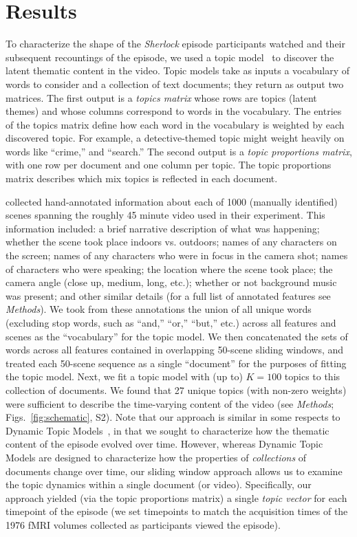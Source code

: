 \documentclass{article}
\newcommand{\topics}{S2}
\begin{document}
\section*{Results}
To characterize the shape of the \textit{Sherlock} episode participants watched and their subsequent recountings of the episode, we used a topic model~\citep{BleiEtal03} to discover the latent thematic content in the video.  Topic models take as inputs a vocabulary of words to consider and a collection of text documents; they return as output two matrices.  The first output is a \textit{topics matrix} whose rows are topics (latent themes) and whose columns correspond to words in the vocabulary. The entries of the topics matrix define how each word in the vocabulary is weighted by each discovered topic.  For example, a detective-themed topic might weight heavily on words like ``crime,'' and ``search.''  The second output is a \textit{topic proportions matrix}, with one row per document and one column per topic.  The topic proportions matrix describes which mix topics is reflected in each document.

\cite{ChenEtal17} collected hand-annotated information about each of 1000 (manually identified) scenes spanning the roughly 45 minute video used in their experiment.  This information included: a brief narrative description of what was happening; whether the scene took place indoors vs. outdoors; names of any characters on the screen; names of any characters who were in focus in the camera shot; names of characters who were speaking; the location where the scene took place; the camera angle (close up, medium, long, etc.); whether or not background music was present; and other similar details (for a full list of annotated features see \textit{Methods}).  We took from these annotations the union of all unique words (excluding stop words, such as ``and,'' ``or,'' ``but,'' etc.) across all features and scenes as the ``vocabulary'' for the topic model.  We then concatenated the sets of words across all features contained in overlapping 50-scene sliding windows, and treated each 50-scene sequence as a single ``document'' for the purposes of fitting the topic model.  Next, we fit a topic model with (up to) $K = 100$ topics to this collection of documents.  We found that 27 unique topics (with non-zero weights) were sufficient to describe the time-varying content of the video (see \textit{Methods}; Figs.~\ref{fig:schematic}, \topics).  Note that our approach is similar in some respects to Dynamic Topic Models~\citep{BleiLaff06}, in that we sought to characterize how the thematic content of the episode evolved over time.  However, whereas Dynamic Topic Models are designed to characterize how the properties of \textit{collections} of documents change over time, our sliding window approach allows us to examine the topic dynamics within a single document (or video).  Specifically, our approach yielded (via the topic proportions matrix) a single \textit{topic vector} for each timepoint of the episode (we set timepoints to match the acquisition times of the 1976 fMRI volumes collected as participants viewed the episode).
\end{document}
